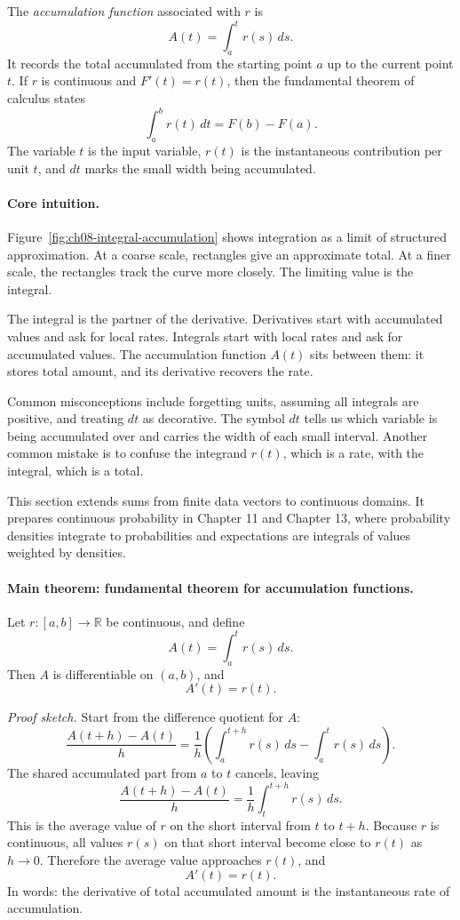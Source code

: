 The \emph{accumulation function} associated with \(r\) is
\[
A(t)=\int_a^t r(s)\,ds.
\]
It records the total accumulated from the starting point \(a\) up to the current point \(t\). If \(r\) is continuous and \(F'(t)=r(t)\), then the fundamental theorem of calculus states
\[
\int_a^b r(t)\,dt=F(b)-F(a).
\]
The variable \(t\) is the input variable, \(r(t)\) is the instantaneous contribution per unit \(t\), and \(dt\) marks the small width being accumulated.

\paragraph{Core intuition.}
Figure~\ref{fig:ch08-integral-accumulation} shows integration as a limit of structured approximation. At a coarse scale, rectangles give an approximate total. At a finer scale, the rectangles track the curve more closely. The limiting value is the integral.

The integral is the partner of the derivative. Derivatives start with accumulated values and ask for local rates. Integrals start with local rates and ask for accumulated values. The accumulation function \(A(t)\) sits between them: it stores total amount, and its derivative recovers the rate.

Common misconceptions include forgetting units, assuming all integrals are positive, and treating \(dt\) as decorative. The symbol \(dt\) tells us which variable is being accumulated over and carries the width of each small interval. Another common mistake is to confuse the integrand \(r(t)\), which is a rate, with the integral, which is a total.

This section extends sums from finite data vectors to continuous domains. It prepares continuous probability in Chapter 11 and Chapter 13, where probability densities integrate to probabilities and expectations are integrals of values weighted by densities.

\paragraph{Main theorem: fundamental theorem for accumulation functions.}
Let \(r:[a,b]\to\mathbb{R}\) be continuous, and define
\[
A(t)=\int_a^t r(s)\,ds.
\]
Then \(A\) is differentiable on \((a,b)\), and
\[
A'(t)=r(t).
\]

\emph{Proof sketch.} Start from the difference quotient for \(A\):
\[
\frac{A(t+h)-A(t)}{h}
=\frac{1}{h}\left(\int_a^{t+h}r(s)\,ds-\int_a^t r(s)\,ds\right).
\]
The shared accumulated part from \(a\) to \(t\) cancels, leaving
\[
\frac{A(t+h)-A(t)}{h}
=\frac{1}{h}\int_t^{t+h}r(s)\,ds.
\]
This is the average value of \(r\) on the short interval from \(t\) to \(t+h\). Because \(r\) is continuous, all values \(r(s)\) on that short interval become close to \(r(t)\) as \(h\to 0\). Therefore the average value approaches \(r(t)\), and
\[
A'(t)=r(t).
\]
In words: the derivative of total accumulated amount is the instantaneous rate of accumulation.

